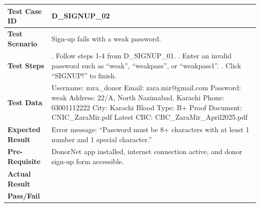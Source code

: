 \documentclass[11pt]{article}
\begin{document}
\noindent
\begin{tabularx}{\textwidth}{|>{\raggedright\arraybackslash}p{}|>{\raggedright\arraybackslash}X|}
\hline
\textbf{Test Case ID} & D\_SIGNUP\_02 \\
\hline
\textbf{Test Scenario} & Sign-up fails with a weak password. \\
\hline
\textbf{Test Steps} & 1. Follow steps 1-4 from D\_SIGNUP\_01. \newline
2. Enter an invalid password such as ``weak'', ``weakpass'', or ``weakpass1''. \newline
3. Click ``SIGNUP!'' to finish. \\
\hline
\textbf{Test Data} & Username: zara\_donor \newline
Email: zara.mir@gmail.com \newline
Password: weak \newline
Address: 22/A, North Nazimabad, Karachi \newline
Phone: 03001112222 \newline
City: Karachi \newline
Blood Type: B+ \newline
Proof Document: CNIC\_ZaraMir.pdf \newline
Latest CBC: CBC\_ZaraMir\_April2025.pdf \\
\hline
\textbf{Expected Result} & Error message: ``Password must be 8+ characters with at least 1 number and 1 special character.'' \\
\hline
\textbf{Pre-Requisite} & DonorNet app installed, internet connection active, and donor sign-up form accessible. \\
\hline
\textbf{Actual Result} &  \\
\hline
\textbf{Pass/Fail} &  \\
\hline
\end{tabularx}
\vspace{1em}
\end{document}

